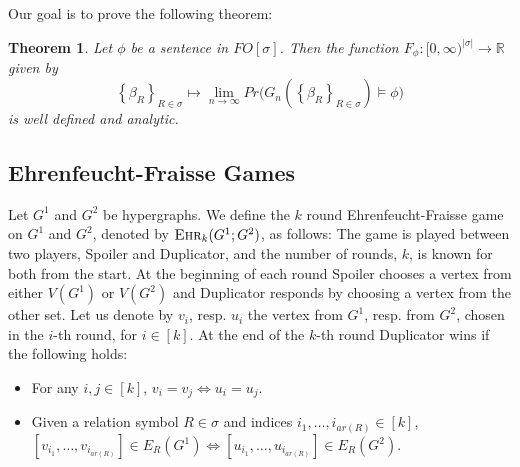 \documentclass[12pt,notitlepage,a4paper]{article}
\newtheorem{theorem}{Theorem}[section]
\theoremstyle{definition}
\newcommand{\R}{\mathbb{R}}
\newcommand{\Ln}{\lim\limits_{n\to \infty}}
\newcommand{\ehr}{\textsc{Ehr}}
\newcommand{\InR}[1]{\left\{ #1_R \right\}_{R\in \sigma}}
\begin{document}
Our goal is to prove the following theorem:

\begin{theorem} \label{thm:main}
	Let $\phi$ be a sentence in $FO[\sigma]$. Then
	the function
	$F_\phi: [0,\infty)^{|\sigma|}
	\rightarrow \R$ given by 
	\[
	\InR{\beta} \mapsto \Ln Pr\big( G_n\left(
	\InR{\beta}\right) \models \phi\big)
	\]
	is well defined and analytic. 
\end{theorem}



\subsection{Ehrenfeucht-Fraisse Games}

Let $G^1$ and $G^2$ be hypergraphs. We define the $k$ round 
Ehrenfeucht-Fraisse game on $G^1$ and $G^2$, denoted by
$\ehr_k(G^1;G^2)$, as follows:
The game is played between two players, Spoiler and Duplicator, and
the number of rounds, $k$, is known for both from the start.
At the beginning of each round Spoiler chooses a vertex from either
$V(G^1)$ or $V(G^2)$ and Duplicator responds by choosing a vertex
from the other set.
Let us denote by 
$v_i$, resp. $u_i$ the vertex from $G^1$, resp. from $G^2$, 
chosen in the $i$-th round,
for $i\in [k]$. At the end of the $k$-th round 
Duplicator wins if the following holds:
\begin{itemize}
	\item For any $i,j\in [k]$, $v_i=v_j \iff u_i=u_j$.
	\item Given a relation symbol $R\in \sigma$ 
	and indices $i_1,\dots, i_{ar(R)} \in [k]$, 
	$[v_{i_1},\dots,v_{i_{ar(R)}}] \in E_R(G^1) \iff 
	[u_{i_1},\dots,u_{i_{ar(R)}}]
	\in E_R(G^2)$.
	
\end{itemize}
\end{document}
